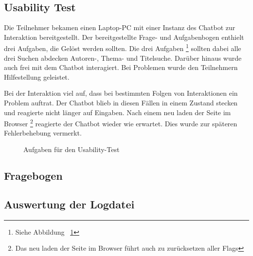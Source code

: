 \documentclass[12pt,a4paper]{article}
\begin{document}
\subsection{Usability Test}

Die Teilnehmer bekamen einen Laptop-PC mit einer Instanz des Chatbot zur Interaktion bereitgestellt.
Der bereitgestellte Frage- und Aufgabenbogen enthielt drei Aufgaben, die Gelöst werden sollten.
Die drei Aufgaben%
\footnote{Siehe Abbildung ~\ref{fig:questions}}
sollten dabei alle drei Suchen abdecken Autoren-, Thema- und Titelsuche.
Darüber hinaus wurde auch frei mit dem Chatbot interagiert.
Bei Problemen wurde den Teilnehmern Hilfestellung geleistet.

Bei der Interaktion viel auf, dass bei bestimmten Folgen von Interaktionen ein Problem auftrat.
Der Chatbot blieb in diesen Fällen in einem Zustand stecken und reagierte nicht länger auf Eingaben.
Nach einem neu laden der Seite im Browser%
\footnote{Das neu laden der Seite im Browser führt auch zu zurücksetzen aller Flags}
reagierte der Chatbot wieder wie erwartet.
Dies wurde zur späteren Fehlerbehebung vermerkt.

\begin{figure}[h]
    \centering
    \caption{Aufgaben für den Usability-Test}
    \label{fig:questions}
\end{figure}


\subsection{Fragebogen}

\subsection{Auswertung der Logdatei}
\end{document}
